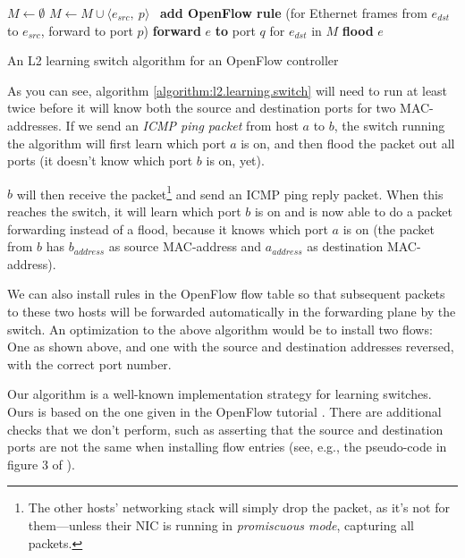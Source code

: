 \begin{algorithm}
  \begin{algorithmic}
    \State $M \gets \emptyset$
    \State
      \State $M \gets M \cup \langle e_{src},\ p \rangle$ 
      \State
      \State \textbf{add OpenFlow rule }(for Ethernet frames from $e_{dst}$ to
        $e_{src}$, forward to port $p$)
      \State
        \State \textbf{forward} $e$ \textbf{to} port $q$ for $e_{dst}$ in $M$
      \Else
        \State \textbf{flood} $e$ 
      \EndIf
    \EndOn
  \end{algorithmic}
  \caption{An L2 learning switch algorithm for an OpenFlow controller}
  \label{algorithm:l2.learning.switch}
\end{algorithm}

As you can see, algorithm \ref{algorithm:l2.learning.switch} will need to
run at least twice before it will know both the source and destination ports
for two MAC-addresses.  If we send an \textit{\acs{ICMP} ping
packet} from host $a$ to $b$, the switch running the algorithm
will first learn which port $a$ is on, and then flood the packet out all
ports (it doesn't know which port $b$ is on, yet).

$b$ will then receive the packet\footnote{The other hosts' networking stack
will simply drop the packet, as it's not for them---unless their \ac{NIC}
is running in \textit{promiscuous mode}, capturing
all packets.} and send an \acs{ICMP} ping reply packet.  When this
reaches the switch, it will learn which port $b$ is on and is now able
to do a packet forwarding instead of a flood, because it knows which
port $a$ is on (the packet from $b$ has $b_{address}$ as source
MAC-address and $a_{address}$ as destination MAC-address).

We can also install rules in the OpenFlow flow table so that
subsequent packets to these two hosts will be forwarded automatically in the
forwarding plane by the switch.  An optimization to the above algorithm
would be to install two flows:  One as shown above, and one with the source
and destination addresses reversed, with the correct port number.

Our algorithm is a well-known implementation strategy for learning
switches.  Ours is based on the one given in the OpenFlow
tutorial \cite{github:pox.tutorial}.
There are additional checks that we don't perform, such as
asserting that the source and destination ports are not the same when
installing flow entries (see, e.g., the pseudo-code in figure 3 of
\cite{Canini:2012:NWT:2228298.2228312}).
